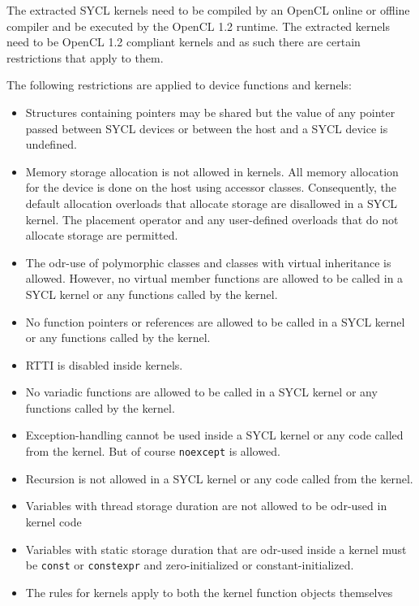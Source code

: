 The extracted SYCL kernels need to be compiled by an OpenCL online or offline
compiler and be executed by the OpenCL 1.2 runtime. The extracted kernels
need to be OpenCL 1.2 compliant kernels and as such there are certain
restrictions that apply to them.

The following restrictions are applied to device functions and kernels:

\begin{itemize}
  \item
    Structures containing pointers may be shared but the value of any pointer
    passed between SYCL devices or between the host and a SYCL device is
    undefined.
  \item
    Memory storage allocation is not allowed in kernels. All memory allocation
    for the device is done on the host using accessor classes.
    Consequently, the default allocation  overloads that
    allocate storage are disallowed in a SYCL kernel. The placement
     operator and any user-defined overloads that do not
    allocate storage are permitted.
  \item
    The odr-use of polymorphic classes and classes with virtual inheritance is allowed.
    However, no virtual member functions are allowed to be called in a SYCL kernel or any functions called by the kernel.
  \item
    No function pointers or references are allowed to be called in a SYCL kernel
    or any functions called by the kernel.
  \item
    RTTI is disabled inside kernels.
  \item
    No variadic functions are allowed to be called in
    a SYCL kernel or any functions called by the kernel.
  \item
    Exception-handling cannot be used inside a SYCL kernel or any
    code called from the kernel. But of course \lstinline{noexcept} is
    allowed.
  \item
    Recursion is not allowed in a SYCL kernel or any
    code called from the kernel.
  \item
    Variables with thread storage duration are not allowed to be odr-used in
    kernel code
  \item
    Variables with static storage duration that are odr-used inside a kernel
    must be \lstinline{const} or \lstinline{constexpr} and zero-initialized or
    constant-initialized.
  \item
    The rules for kernels apply to both the kernel function objects themselves

\end{itemize}
